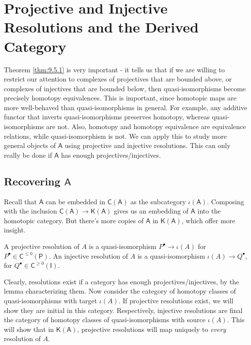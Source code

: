 \section{Projective and Injective Resolutions and the Derived Category}
Theorem \ref{thm:9.5.1} is very important - it tells us that if we are willing to restrict our attention to complexes of projectives that are bounded above, or complexes of injectives that are bounded below, then quasi-isomorphisms become precisely homotopy equivalences. This is important, since homotopic maps are more well-behaved than quasi-isomorphisms in general. For example, any additive functor that inverts quasi-isomorphisms preserves homotopy, whereas quasi-isomorphisms are not. Also, homotopy and homotopy equivalence are equivalence relations, while quasi-isomorphism is not. We can apply this to study more general objects of $\mathsf{A} $ using projective and injective resolutions. This can only really be done if $\mathsf{A} $ has enough projectives/injectives.

\subsection{Recovering $\mathsf{A} $}
Recall that $\mathsf{A} $ can be embedded in $\mathsf{C} (\mathsf{A} )$ as the subcategory $\iota (\mathsf{A}) $. Composing with the inclusion $\mathsf{C} (\mathsf{A} )\to \mathsf{K} (\mathsf{A} )$ gives us an embedding of $\mathsf{A} $ into the homotopic category. But there's more copies of $\mathsf{A} $ in $\mathsf{K} (\mathsf{A} )$, which offer more insight.

\begin{definition}[Resolution]\label{dfn:9.6.1}
	A projective resolution of $A$ is a quasi-isomorphism $P^{\bullet} \to \iota (A)$ for $P^{\bullet} \in \mathsf{C} ^{\leq 0} (\mathsf{P} )$. An injective resolution of $A$ is a quasi-isomorphism $\iota (A)\to Q^{\bullet} $, for $Q^{\bullet} \in \mathsf{C} ^{\geq 0} (\mathsf{I} )$.
\end{definition}

Clearly, resolutions exist if a category has enough projectives/injectives, by the lemma characterizing them. Now consider the category of homotopy classes of quasi-isomorphisms with target $\iota (A)$. If projective resolutions exist, we will show they are initial in this category. Respectively, injective resolutions are final the category of homotopy classes of quasi-isomorphisms with source $\iota (A)$. This will show that in $\mathsf{K} (\mathsf{A} )$, projective resolutions will map uniquely to \emph{every} resolution of $A$.

